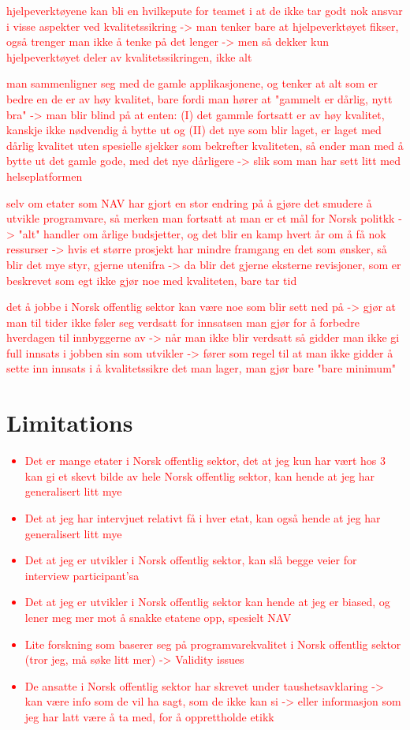 \textcolor{red}{hjelpeverktøyene kan bli en hvilkepute for teamet i at de ikke tar godt nok ansvar i visse aspekter ved kvalitetssikring -> man tenker bare at hjelpeverktøyet fikser, også trenger man ikke å tenke på det lenger -> men så dekker kun hjelpeverktøyet deler av kvalitetssikringen, ikke alt}

\textcolor{red}{man sammenligner seg med de gamle applikasjonene, og tenker at alt som er bedre en de er av høy kvalitet, bare fordi man hører at "gammelt er dårlig, nytt bra" -> man blir blind på at enten: (I) det gammle fortsatt er av høy kvalitet, kanskje ikke nødvendig å bytte ut og (II) det nye som blir laget, er laget med dårlig kvalitet uten spesielle sjekker som bekrefter kvaliteten, så ender man med å bytte ut det gamle gode, med det nye dårligere -> slik som man har sett litt med helseplatformen}

\textcolor{red}{selv om etater som NAV har gjort en stor endring på å gjøre det smudere å utvikle programvare, så merken man fortsatt at man er et mål for Norsk politkk -> "alt" handler om årlige budsjetter, og det blir en kamp hvert år om å få nok ressurser -> hvis et større prosjekt har mindre framgang en det som ønsker, så blir det mye styr, gjerne utenifra -> da blir det gjerne eksterne revisjoner, som er beskrevet som egt ikke gjør noe med kvaliteten, bare tar tid}

\textcolor{red}{det å jobbe i Norsk offentlig sektor kan være noe som blir sett ned på -> gjør at man til tider ikke føler seg verdsatt for innsatsen man gjør for å forbedre hverdagen til innbyggerne av -> når man ikke blir verdsatt så gidder man ikke gi full innsats i jobben sin som utvikler -> fører som regel til at man ikke gidder å sette inn innsats i å kvalitetssikre det man lager, man gjør bare "bare minimum"}

\section{Limitations}
\textcolor{red}{\begin{itemize}
    \item Det er mange etater i Norsk offentlig sektor, det at jeg kun har vært hos 3 kan gi et skevt bilde av hele Norsk offentlig sektor, kan hende at jeg har generalisert litt mye
    \item Det at jeg har intervjuet relativt få i hver etat, kan også hende at jeg har generalisert litt mye
    \item Det at jeg er utvikler i Norsk offentlig sektor, kan slå begge veier for interview participant'sa
    \item Det at jeg er utvikler i Norsk offentlig sektor kan hende at jeg er biased, og lener meg mer mot å snakke etatene opp, spesielt NAV
    \item Lite forskning som baserer seg på programvarekvalitet i Norsk offentlig sektor (tror jeg, må søke litt mer) -> Validity issues
    \item De ansatte i Norsk offentlig sektor har skrevet under taushetsavklaring -> kan være info som de vil ha sagt, som de ikke kan si -> eller informasjon som jeg har latt være å ta med, for å opprettholde etikk
\end{itemize}}


